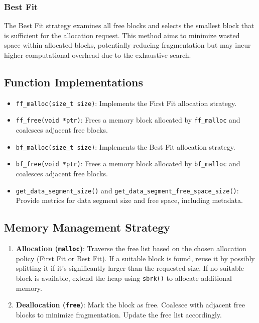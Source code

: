 \documentclass[12pt]{article}
\begin{document}
\subsubsection{Best Fit}
The Best Fit strategy examines all free blocks and selects the smallest block that is sufficient for the allocation request. This method aims to minimize wasted space within allocated blocks, potentially reducing fragmentation but may incur higher computational overhead due to the exhaustive search.

\subsection{Function Implementations}
\begin{itemize}
    \item \texttt{ff\_malloc(size\_t size)}: Implements the First Fit allocation strategy.
    \item \texttt{ff\_free(void *ptr)}: Frees a memory block allocated by \texttt{ff\_malloc} and coalesces adjacent free blocks.
    \item \texttt{bf\_malloc(size\_t size)}: Implements the Best Fit allocation strategy.
    \item \texttt{bf\_free(void *ptr)}: Frees a memory block allocated by \texttt{bf\_malloc} and coalesces adjacent free blocks.
    \item \texttt{get\_data\_segment\_size()} and \texttt{get\_data\_segment\_free\_space\_size()}: Provide metrics for data segment size and free space, including metadata.
\end{itemize}

\subsection{Memory Management Strategy}
\begin{enumerate}
    \item \textbf{Allocation (\texttt{malloc})}: Traverse the free list based on the chosen allocation policy (First Fit or Best Fit). If a suitable block is found, reuse it by possibly splitting it if it's significantly larger than the requested size. If no suitable block is available, extend the heap using \texttt{sbrk()} to allocate additional memory.

    \item \textbf{Deallocation (\texttt{free})}: Mark the block as free. Coalesce with adjacent free blocks to minimize fragmentation. Update the free list accordingly.
\end{enumerate}
\end{document}
